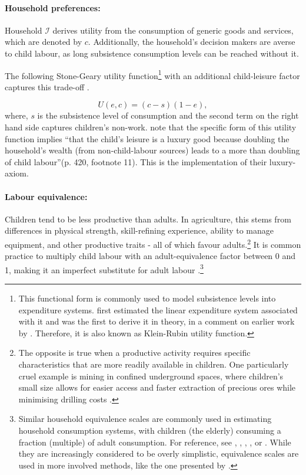 \documentclass[a4paper,12pt]{article}
\theoremstyle{plain}
\theoremstyle{definition}
\theoremstyle{definition}
\theoremstyle{definition}
\theoremstyle{definition}
\begin{document}
\paragraph{Household preferences:}
\label{sec:hhpreferences}

Household $\mathcal{I}$ derives utility from the consumption of generic goods and services, which are denoted by $c$. Additionally, the household's decision makers are averse to child labour, as long subsistence consumption levels can be reached without it.

The following Stone-Geary utility function\footnote{This functional form is commonly used to model subsistence levels into expenditure systems. \citet{stone1954} first estimated the linear expenditure system associated with it and \citet{geary1950} was the first to derive it in theory, in a comment on earlier work by \citet{klein1947}. Therefore, it is also known as Klein-Rubin utility function.} with an additional child-leisure factor captures this trade-off \citep[cf.][]{Basu1998}.

\begin{equation}
\label{eq:UF}
    U(e,c)=(c-s)(1-e),
\end{equation}
where, $s$ is the subsistence level of consumption and the second term on the right hand side captures children's non-work. \citet{Basu1998} note that the specific form of this utility function implies ``that the child's leisure is a luxury good because doubling the household's wealth (from non-child-labour sources) leads to a more than doubling of child labour''(p. 420, footnote 11). This is the implementation of their luxury-axiom.

\paragraph{Labour equivalence:} Children tend to be less productive than adults. In agriculture, this stems from differences in physical strength, skill-refining experience, ability to manage equipment, and other productive traits - all of which favour adults.\footnote{The opposite is true when a productive activity requires specific characteristics that are more readily available in children. One particularly cruel example is mining in confined underground spaces, where children's small size allows for easier access and faster extraction of precious ores while minimising drilling costs  \citep[see e.g.][]{Odriscoll2017}.} It is common practice to multiply child labour with an adult-equivalence factor between 0 and 1, making it an imperfect substitute for adult labour \citep{Basu1998, Baland2000, Bhalotra2003, Basu2010, Dwibedi2017, Dumas2020}.\footnote{Similar household equivalence scales are commonly used in estimating household consumption systems, with children (the elderly) consuming a fraction (multiple) of adult consumption. For reference, see \citet{Pollak1979}, \citet{Lewbel1989}, \citet{Blundell1994}, \citet{Lewbel1997}, or \citet{Deaton1999}. While they are increasingly considered to be overly simplistic, equivalence scales are used in more involved methods, like the one presented by \citet{Dunbar2013}.}
\end{document}
